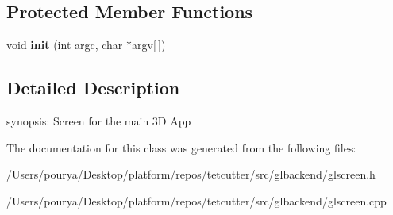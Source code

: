 \subsection*{Protected Member Functions}
\begin{DoxyCompactItemize}
\item 
\hypertarget{classps_1_1opengl_1_1GLScreen_a484a950f8c1c67987ac3360774abfb9e}{}void {\bfseries init} (int argc, char $\ast$argv\mbox{[}$\,$\mbox{]})\label{classps_1_1opengl_1_1GLScreen_a484a950f8c1c67987ac3360774abfb9e}

\end{DoxyCompactItemize}


\subsection{Detailed Description}
synopsis\+: Screen for the main 3\+D App 

The documentation for this class was generated from the following files\+:\begin{DoxyCompactItemize}
\item 
/\+Users/pourya/\+Desktop/platform/repos/tetcutter/src/glbackend/glscreen.\+h\item 
/\+Users/pourya/\+Desktop/platform/repos/tetcutter/src/glbackend/glscreen.\+cpp\end{DoxyCompactItemize}
